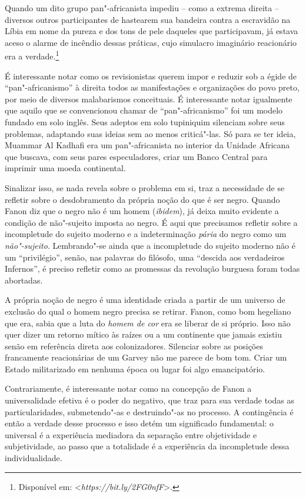 Quando um dito grupo pan"-africanista impediu -- como a extrema direita
-- diversos outros participantes de hastearem sua bandeira contra a
escravidão na Líbia em nome da pureza e dos tons de pele daqueles que
participavam, já estava aceso o alarme de incêndio dessas práticas, cujo
simulacro imaginário reacionário era a
verdade.\footnote{Disponível em:
  \textless{}\emph{https://bit.ly/2FG0nfF}\textgreater{}.}

É interessante notar como os revisionistas querem impor e reduzir sob a
égide de ``pan"-africanismo'' à direita todos as manifestações e
organizações do povo preto, por meio de diversos malabarismos
conceituais. É interessante notar igualmente que aquilo que se
convencionou chamar de ``pan"-africanismo'' foi um modelo fundado em solo
inglês. Seus adeptos em solo tupiniquim silenciam sobre seus problemas,
adaptando suas ideias sem ao menos criticá"-las. Só para se ter ideia,
Muammar Al Kadhafi era um
pan"-africanista no interior da Unidade Africana que buscava, com seus
pares especuladores, criar um Banco Central para imprimir uma moeda
continental.

Sinalizar isso, se nada revela sobre o problema em si, traz a
necessidade de se refletir sobre o desdobramento da própria noção do que
é ser negro. Quando Fanon diz que o negro não é um homem (\emph{ibidem}), já
deixa muito evidente a condição de não"-sujeito imposta ao negro. É aqui
que precisamos refletir sobre a incompletude do sujeito moderno e a
indeterminação \emph{pária} do negro como um \emph{não"-sujeito}.
Lembrando"-se ainda que a incompletude do sujeito moderno não é um
``privilégio'', senão, nas palavras do filósofo, uma ``descida aos
verdadeiros Infernos'', é preciso refletir como as promessas da
revolução burguesa foram todas abortadas.

A própria noção de negro é uma identidade criada a partir de um universo
de exclusão do qual o homem negro precisa se retirar. Fanon, como bom
hegeliano que era, sabia que a luta do \emph{homem de cor} era se
liberar de si próprio. Isso não quer dizer um retorno mítico às raízes
ou a um continente que jamais existiu senão em referência direta aos
colonizadores. Silenciar sobre as posições francamente reacionárias de
um Garvey não me parece de bom tom. Criar um Estado militarizado em
nenhuma época ou lugar foi algo emancipatório.

Contrariamente, é interessante notar como na concepção de Fanon a
universalidade efetiva é o poder do negativo, que traz para sua verdade
todas as particularidades, submetendo"-as e destruindo"-as no processo. A
contingência é então a verdade desse processo e isso detém um
significado fundamental: o universal é a experiência mediadora da
separação entre objetividade e subjetividade, ao passo que a totalidade
é a experiência da incompletude dessa individualidade.

